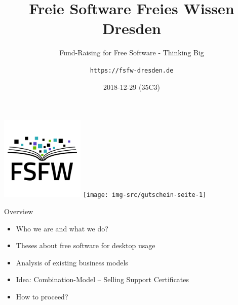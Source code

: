 \documentclass[t]{beamer}
\title{Freie Software Freies Wissen Dresden}
\subtitle{Fund-Raising for Free Software - Thinking Big}
\author{\texttt{https://fsfw-dresden.de}}
\date{2018-12-29 (35C3)}
\begin{document}
\begin{frame}[label=p1]
  \begin{center}%
\vspace*{-1em}
\includegraphics[width=4cm]{img-src/fsfw-logo-with-text}
\hspace{1cm}
\texttt{[image: img-src/gutschein-seite-1]}\\
\vspace{1em}
  \end{center}
\end{frame}


\begin{frame}[label=ol]{\color{fg}Overview}
  \begin{itemize}
  \item Who we are and what we do?
  \item Theses about free software for desktop usage
  \item Analysis of existing business models
  \item Idea: Combination-Model -- Selling Support Certificates
  \item How to proceed?
  \end{itemize}
\end{frame}




\end{document}
